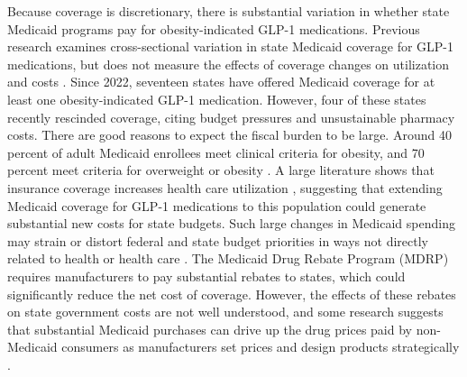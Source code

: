Because coverage is discretionary, there is substantial variation in whether state Medicaid programs pay for obesity-indicated GLP-1 medications. Previous research examines cross-sectional variation in state Medicaid coverage for GLP-1 medications, but does not measure the effects of coverage changes on utilization and costs \citep{liu2024state, klebanoff2025medicaid}. Since 2022, seventeen states have offered Medicaid coverage for at least one obesity-indicated GLP-1 medication. However, four of these states recently rescinded coverage, citing budget pressures and unsustainable pharmacy costs. There are good reasons to expect the fiscal burden to be large. Around 40 percent of adult Medicaid enrollees meet clinical criteria for obesity, and 70 percent meet criteria for overweight or obesity \citep{mylona2020association}. A large literature shows that insurance coverage increases health care utilization \citep{manning1987health,finkelstein2012oregon}, suggesting that extending Medicaid coverage for GLP-1 medications to this population could generate substantial new costs for state budgets. Such large changes in Medicaid spending may strain or distort federal and state budget priorities in ways not directly related to health or health care \citep{baicker2005fiscal, gruber2017federal, clemens2018implications}. The Medicaid Drug Rebate Program (MDRP) requires manufacturers to pay substantial rebates to states, which could significantly reduce the net cost of coverage. However, the effects of these rebates on state government costs are not well understood, and some research suggests that substantial Medicaid purchases can drive up the drug prices paid by non-Medicaid consumers as manufacturers set prices and design products strategically \citep{duggan2006distortionary}.

